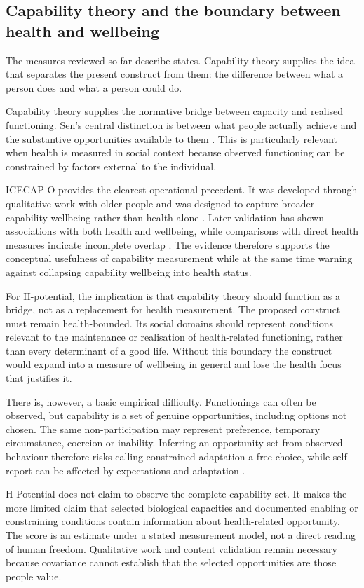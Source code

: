 \subsection{Capability theory and the boundary between health and wellbeing}

The measures reviewed so far describe states. Capability theory supplies the idea that separates the present construct from them: the difference between what a person does and what a person could do.

Capability theory supplies the normative bridge between capacity and realised functioning. Sen's central distinction is between what people actually achieve and the substantive opportunities available to them \citep{sen_1993}. This is particularly relevant when health is measured in social context because observed functioning can be constrained by factors external to the individual.

ICECAP-O provides the clearest operational precedent. It was developed through qualitative work with older people and was designed to capture broader capability wellbeing rather than health alone \citep{icecap_o}. Later validation has shown associations with both health and wellbeing, while comparisons with direct health measures indicate incomplete overlap \citep{icecap_o_validation}. The evidence therefore supports the conceptual usefulness of capability measurement while at the same time warning against collapsing capability wellbeing into health status.

For H-potential, the implication is that capability theory should function as a bridge, not as a replacement for health measurement. The proposed construct must remain health-bounded. Its social domains should represent conditions relevant to the maintenance or realisation of health-related functioning, rather than every determinant of a good life. Without this boundary the construct would expand into a measure of wellbeing in general and lose the health focus that justifies it.

There is, however, a basic empirical difficulty. Functionings can often
be observed, but capability is a set of genuine opportunities, including options
not chosen. The same non-participation may represent preference, temporary
circumstance, coercion or inability. Inferring an opportunity set from observed
behaviour therefore risks calling constrained adaptation a free choice, while
self-report can be affected by expectations and adaptation \citep{cookson_2005}.

H-Potential does not claim to observe the complete capability set. It makes the
more limited claim that selected biological capacities and documented enabling
or constraining conditions contain information about health-related opportunity.
The score is an estimate under a stated measurement model, not a direct reading
of human freedom. Qualitative work and content validation remain necessary
because covariance cannot establish that the selected opportunities are those
people value.

